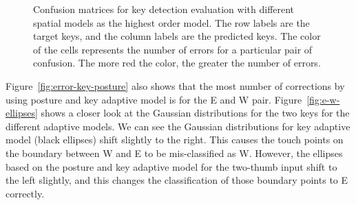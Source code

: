 \documentclass{sigchi}
\begin{document}
\begin{figure}[tb]
{    \label{fig:error-key-posture}
  }
  \caption{Confusion matrices for key detection evaluation with different
  spatial models as the highest order model. The row labels are the
  target keys, and the column labels are the predicted keys.  The color of the cells
represents the number of errors for a particular pair of confusion. The more red the color,
the greater the number of errors.}
  \label{fig:confusion-matrices}
\end{figure}

Figure~\ref{fig:error-key-posture} also shows that the most number of
corrections by using posture and key adaptive model is for the E and W pair. Figure~\ref{fig:e-w-ellipses}
shows a closer look at the Gaussian distributions for the two keys for the different
adaptive models. We can see the Gaussian distributions for key adaptive model (black ellipses) shift slightly to the right. This causes the touch points on the boundary between W and 
E to be mis-classified as W. However, the ellipses based on the posture and key
adaptive model for the two-thumb input shift to the left slightly, and this changes
the classification of those boundary points to E correctly.
\end{document}
